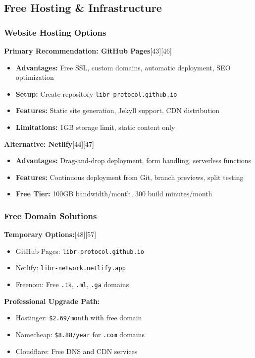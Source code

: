 \documentclass[12pt,a4paper]{article}
\begin{document}
\subsection{Free Hosting \& Infrastructure}

\subsubsection{Website Hosting Options}
\textbf{Primary Recommendation: GitHub Pages}[43][46]
\begin{itemize}
    \item \textbf{Advantages:} Free SSL, custom domains, automatic deployment, SEO optimization
    \item \textbf{Setup:} Create repository \texttt{libr-protocol.github.io}
    \item \textbf{Features:} Static site generation, Jekyll support, CDN distribution
    \item \textbf{Limitations:} 1GB storage limit, static content only
\end{itemize}

\textbf{Alternative: Netlify}[44][47]
\begin{itemize}
    \item \textbf{Advantages:} Drag-and-drop deployment, form handling, serverless functions
    \item \textbf{Features:} Continuous deployment from Git, branch previews, split testing
    \item \textbf{Free Tier:} 100GB bandwidth/month, 300 build minutes/month
\end{itemize}

\subsubsection{Free Domain Solutions}
\textbf{Temporary Options:}[48][57]
\begin{itemize}
    \item GitHub Pages: \texttt{libr-protocol.github.io}
    \item Netlify: \texttt{libr-network.netlify.app}
    \item Freenom: Free \texttt{.tk}, \texttt{.ml}, \texttt{.ga} domains
\end{itemize}

\textbf{Professional Upgrade Path:}
\begin{itemize}
    \item Hostinger: \texttt{\$2.69/month} with free domain
    \item Namecheap: \texttt{\$8.88/year} for \texttt{.com} domains
    \item Cloudflare: Free DNS and CDN services
\end{itemize}
\end{document}
